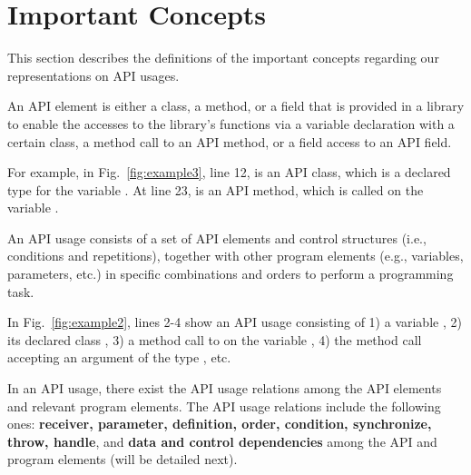\section{Important Concepts}
\label{sec:concepts}

This section describes the definitions of the important concepts
regarding our representations on API usages.


\begin{Definition}
  An API element is either a class, a method, or a field that is
  provided in a library to enable the accesses to the library's
  functions via a variable declaration with a certain class, a method
  call to an API method, or a field access to an API field.
\end{Definition}

For example, in Fig.~\ref{fig:example3}, line 12,  is
an API class, which is a declared type for the variable
. At line 23,  is an API
method, which is called on the variable .

\begin{Definition}
An API usage consists of a set of API elements and control structures
(i.e., conditions and repetitions), together with other program
elements (e.g., variables, parameters, etc.) in specific combinations
and orders to perform a programming task.
\end{Definition}

In Fig.~\ref{fig:example2}, lines 2-4 show an API usage consisting
of 1) a variable , 2) its declared class ,
3) a method call to  on the variable
, 4) the method call  accepting an
argument of the type , etc.

\begin{Definition}
  In an API usage, there exist the API usage relations among the API
  elements and relevant program elements. The API usage relations
  include the following ones: {\bf receiver, parameter, definition,
    order, condition, synchronize, throw, handle}, and {\bf data and
    control dependencies} among the API and program elements (will be
  detailed next).
\end{Definition}

